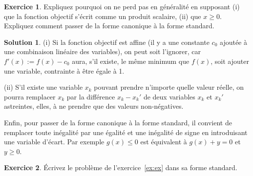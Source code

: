 \documentclass[a4paper,francais]{article}
\theoremstyle{definition}
\newtheorem{exercice}{Exercice}[section]
\newtheorem*{solution}{Solution}
\begin{document}
\begin{exercice}
  Expliquez pourquoi on ne perd pas en généralité en supposant (i)
  que la fonction objectif s'écrit comme un produit scalaire, (ii)
  que $x \geq 0$. 
  Expliquez comment passer de la forme canonique à la forme standard.
\end{exercice}

\begin{solution}
  (i) Si la fonction objectif est affine (il y a une constante $c_0$ ajoutée à une
  combinaison linéaire des variables), on peut soit l'ignorer, car $f'(x)  := f(x)
  - c_0$ aura, s'il existe, le même minimum que $f(x)$, soit ajouter une variable,
  contrainte à être égale à 1. 
  
  (ii) S'il existe une variable $x_k$ pouvant prendre n'importe quelle valeur réelle,
  on pourra remplacer $x_k$ par la différence $x_k - x_k'$ de deux variables
  $x_k$ et $x_k'$ astreintes, elles, à ne prendre que des valeurs non-négatives.

  Enfin, pour passer de la forme canonique à la forme standard, il convient de remplacer
  toute inégalité par une égalité et une inégalité de signe
  en introduisant une variable d'écart. Par exemple $g(x) \leq 0$ est équivalent
  à $g(x) + y = 0$ et $y \geq 0$.
\end{solution}

\begin{exercice}
\'Ecrivez le problème de l'exercice~\ref{ex:ex} dans sa forme standard.
\end{exercice}
\end{document}

